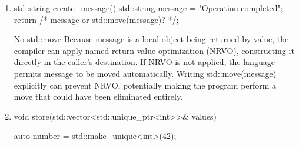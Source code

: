 \documentclass{report}
\begin{document}
\begin{itemize}
\begin{enumerate}
\begin{cppcode}
{                        private:
                            std::string name_;
                        };
                    \end{cppcode}
                    \bigbreak \noindent 
                    You should use std::move(name) here:
                    \begin{itemize}
                        \item If the caller passes a temporary string (rvalue), it is moved into the parameter, and then moved into the member. Total cost: two cheap moves, zero deep copies.
                        \item If the caller passes an existing string (lvalue), it is copied into the parameter, and then moved into the member. Total cost: one copy, one cheap move.
                    \end{itemize}
                    Pass-by-Value + std::move: Passing by value and then moving it into the member variable is the standard modern C++ idiom (frequently called "sink parameters"). It is highly efficient because:
                \item 
                    \bigbreak \noindent 
                    \begin{cppcode}
                        std::string create_message() {
                            std::string message = "Operation completed";
                            return /* message or std::move(message)? */;
                        }
                    \end{cppcode}
                    \bigbreak \noindent 
                    No std::move
                    \bigbreak \noindent 
                    Because message is a local object being returned by value, the compiler can apply named return value optimization (NRVO), constructing it directly in the caller’s destination.
                    \bigbreak \noindent 
                    If NRVO is not applied, the language permits message to be moved automatically. Writing std::move(message) explicitly can prevent NRVO, potentially making the program perform a move that could have been eliminated entirely.
                \item 
                    \bigbreak \noindent 
                    \begin{cppcode}
                        void store(std::vector<std::unique_ptr<int>>& values) {
                            auto number = std::make_unique<int>(42);

}
\end{cppcode}
\end{enumerate}
\end{itemize}
\end{document}
